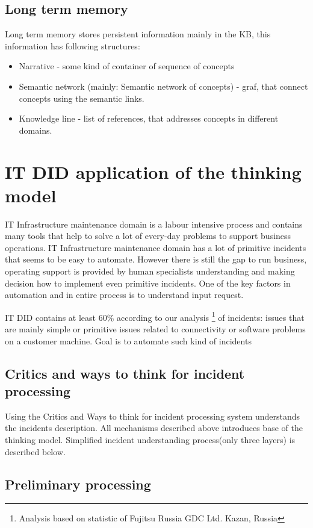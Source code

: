 \documentclass[conference]{IEEEtran}
\begin{document}
\subsection{Long term memory}
Long term memory stores persistent information mainly in the KB, this information has following structures:

\begin{itemize}
  \item Narrative - some kind of container of sequence of concepts
  \item Semantic network (mainly: Semantic network of concepts) - graf, that connect concepts using the semantic links.
  \item Knowledge line - list of references, that addresses concepts in different domains.
\end{itemize}

\section{IT DID application of the thinking model}

IT Infrastructure maintenance domain is a labour intensive process and contains many tools that help to solve a lot of every-day problems to support business operations. IT Infrastructure maintenance domain has a lot of primitive incidents that seems to be easy to automate. However there is still the gap to run business, operating support is provided by human specialists understanding and making decision how to implement even primitive incidents. One of the key factors in automation and in entire process is to understand input request.

IT DID contains at least 60\% according to our analysis \footnote{Analysis based on statistic of Fujitsu Russia GDC Ltd. Kazan, Russia } of incidents: issues that are mainly simple or primitive issues related to connectivity or software problems on a customer machine. Goal is to automate such kind of incidents

\subsection{Critics and ways to think for incident processing}
Using the Critics and Ways to think for incident processing system understands the incidents description.
All mechanisms described above introduces base of the thinking model. Simplified incident understanding process(only three layers) is described below.

\subsection{Preliminary processing}
\end{document}
